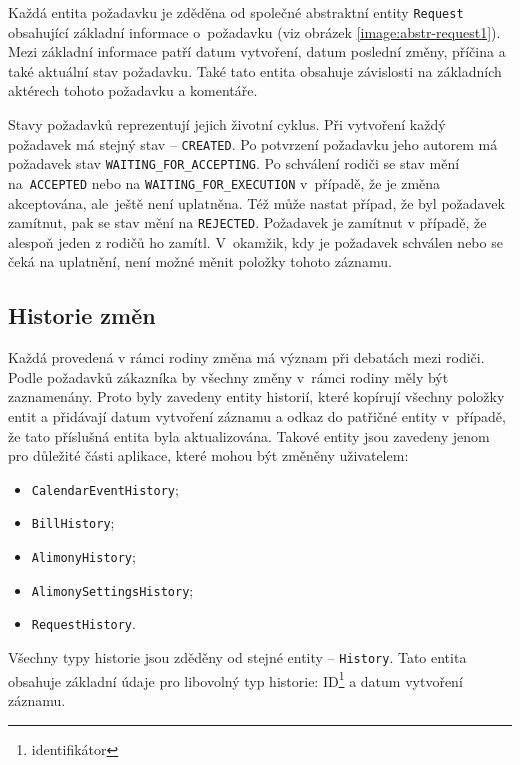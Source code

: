         Každá entita požadavku je zděděna od společné abstraktní entity \verb|Request| obsahující základní informace o~požadavku (viz obrázek \ref{image:abstr-request1}). Mezi základní informace patří datum vytvoření, datum poslední změny, příčina a také aktuální stav požadavku. Také tato entita obsahuje závislosti na základních aktérech tohoto požadavku a komentáře.
        
        Stavy požadavků reprezentují jejich životní cyklus. Při vytvoření každý požadavek má stejný stav -- \verb|CREATED|. Po potvrzení požadavku jeho autorem má požadavek stav \verb|WAITING_FOR_ACCEPTING|. Po schválení rodiči se stav mění na~\verb|ACCEPTED| nebo na \verb|WAITING_FOR_EXECUTION| v~případě, že je změna akceptována, ale~ještě není uplatněna. Též může nastat případ, že byl požadavek zamítnut, pak se stav mění na \verb|REJECTED|. Požadavek je zamítnut v případě, že alespoň jeden z rodičů ho zamítl. V~okamžik, kdy je požadavek schválen nebo se čeká na uplatnění, není možné měnit položky tohoto záznamu.
    
    \subsection{Historie změn}
        Každá provedená v rámci rodiny změna má význam při debatách mezi rodiči. Podle požadavků zákazníka by všechny změny v~rámci rodiny měly být zaznamenány. Proto byly zavedeny entity historií, které kopírují všechny položky entit a přidávají datum vytvoření záznamu a odkaz do patřičné entity v~případě, že tato příslušná entita byla aktualizována. Takové entity jsou zavedeny jenom pro důležité části aplikace, které mohou být změněny uživatelem:
        \begin{itemize}
            \item \texttt{CalendarEventHistory};
            \item \texttt{BillHistory};
            \item \texttt{AlimonyHistory};
            \item \texttt{AlimonySettingsHistory};
            \item \texttt{RequestHistory}.
        \end{itemize}
        Všechny typy historie jsou zděděny od stejné entity -- \verb|History|. Tato entita obsahuje základní údaje pro libovolný typ historie: ID\footnote{identifikátor} a datum vytvoření záznamu. 
     
